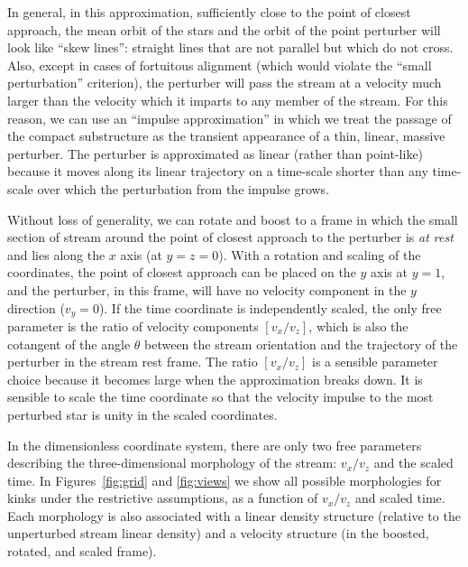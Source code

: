 \documentclass[12pt,preprint]{aastex}
\begin{document}
In general, in this approximation, sufficiently close to the point of
closest approach, the mean orbit of the stars and the orbit of the
point perturber will look like ``skew lines'': straight lines that are
not parallel but which do not cross.  Also, except in cases of
fortuitous alignment (which would violate the ``small perturbation''
criterion), the perturber will pass the stream at a velocity much
larger than the velocity which it imparts to any member of the stream.
For this reason, we can use an ``impulse approximation'' in which we
treat the passage of the compact substructure as the
transient appearance of a
thin, linear, massive perturber.  The perturber is approximated as
linear (rather than point-like) because it moves along its linear
trajectory on a time-scale shorter than any time-scale over which the
perturbation from the impulse grows.

Without loss of generality, we can rotate and boost to a frame in
which the small section of stream around the point of closest approach
to the perturber is \emph{at rest} and lies along the $x$ axis (at
$y=z=0$).  With a rotation and scaling of the coordinates, the point
of closest approach can be placed on the $y$ axis at $y=1$, and the
perturber, in this frame, will have no velocity component in the $y$
direction ($v_y=0$).  If the time coordinate is independently scaled,
the only free parameter is the ratio of velocity components
$[v_x/v_z]$, which is also the cotangent of the angle $\theta$ between
the stream orientation and the trajectory of the perturber in the
stream rest frame.  The ratio $[v_x/v_z]$ is a sensible parameter
choice because it becomes large when the approximation breaks down.
It is sensible to scale the time coordinate so that the velocity
impulse to the most perturbed star is unity in the scaled coordinates.

In the dimensionless coordinate system, there are only two free
parameters describing the three-dimensional morphology of the stream:
$v_x/v_z$ and the scaled time.  In Figures~\ref{fig:grid} and
\ref{fig:views} we show all possible morphologies for kinks under the
restrictive assumptions, as a function of $v_x/v_z$ and scaled time.
Each morphology is also associated with a linear density structure
(relative to the unperturbed stream linear density) and a velocity
structure (in the boosted, rotated, and scaled frame).
\end{document}
